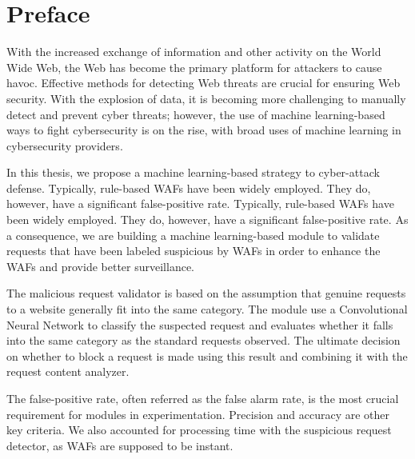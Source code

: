 \chapter*{Preface}
\thispagestyle{fancy}
\label{tom_tat}
\hspace*{5cm}

With the increased exchange of information and other activity on the World Wide Web, the Web has become the primary platform for attackers to cause havoc. Effective methods for detecting Web threats are crucial for ensuring Web security. With the explosion of data, it is becoming more challenging to manually detect and prevent cyber threats; however, the use of machine learning-based ways to fight cybersecurity is on the rise, with broad uses of machine learning in cybersecurity providers. 

In this thesis, we propose a machine learning-based strategy to cyber-attack defense. Typically, rule-based WAFs have been widely employed. They do, however, have a significant false-positive rate. Typically, rule-based WAFs have been widely employed. They do, however, have a significant false-positive rate. As a consequence, we are building a machine learning-based module to validate requests that have been labeled suspicious by WAFs in order to enhance the WAFs and provide better surveillance. 

The malicious request validator is based on the assumption that genuine requests to a website generally fit into the same category. The module use a Convolutional Neural Network to classify the suspected request and evaluates whether it falls into the same category as the standard requests observed. The ultimate decision on whether to block a request is made using this result and combining it with the request content analyzer.


The false-positive rate, often referred as the false alarm rate, is the most crucial requirement for modules in experimentation. Precision and accuracy are other key criteria. We also accounted for processing time with the suspicious request detector, as WAFs are supposed to be instant.
	
\cleardoublepage